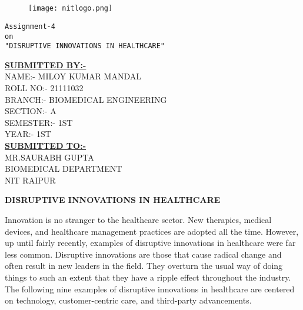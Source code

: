\documentclass[12pt,a4paper]{report}
\begin{document}
 


\begin{center}
    \Large{}\\
\end{center}

\begin{center}
    \Large{}\\ 
\end{center}

\begin{figure}
    \centering
    \texttt{[image: nitlogo.png]}
\end{figure}

\begin{center}
   \huge{\texttt{Assignment-4\\ on\\ "DISRUPTIVE INNOVATIONS IN HEALTHCARE"}}
  \end{center}
 
  
\begin{center}
\textbf{\underline{SUBMITTED BY:-}}\\

NAME:- MILOY KUMAR MANDAL\\
ROLL NO:- 21111032\\
BRANCH:- BIOMEDICAL ENGINEERING\\
SECTION:- A\\
SEMESTER:- 1ST\\
YEAR:- 1ST\\

\textbf{\underline{SUBMITTED TO:-}}\\
MR.SAURABH GUPTA\\
BIOMEDICAL DEPARTMENT\\
NIT RAIPUR\\


 
\end{center} 
\clearpage

\begin{center}
  \huge{\textbf{DISRUPTIVE INNOVATIONS IN HEALTHCARE}}
\end{center}


Innovation is no stranger to the healthcare sector. New therapies, medical devices, and healthcare management practices are adopted all the time. However, up until fairly recently, examples of disruptive innovations in healthcare were far less common. Disruptive innovations are those that cause radical change and often result in new leaders in the field. They overturn the usual way of doing things to such an extent that they have a ripple effect throughout the industry. The following nine examples of disruptive innovations in healthcare are centered on technology, customer-centric care, and third-party advancements.\par
\end{document}
